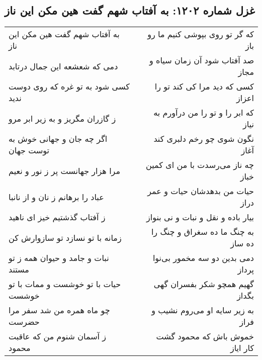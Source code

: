 \begin{center}
\section*{غزل شماره ۱۲۰۲: به آفتاب شهم گفت هین مکن این ناز}
\label{sec:1202}
\begin{longtable}{l p{0.5cm} r}
به آفتاب شهم گفت هین مکن این ناز
&&
که گر تو روی بپوشی کنیم ما رو باز
\\
دمی که شعشعه این جمال درتابد
&&
صد آفتاب شود آن زمان سیاه و مجاز
\\
کسی شود به تو غره که روی دوست ندید
&&
کسی که دید مرا کی کند تو را اعزاز
\\
ز گازران مگریز و به زیر ابر مرو
&&
که ابر را و تو را من درآورم به نیاز
\\
اگر چه جان و جهانی خوش به توست جهان
&&
نگون شوی چو رخم دلبری کند آغاز
\\
مرا هزار جهانست پر ز نور و نعیم
&&
چه ناز می‌رسدت با من ای کمین خباز
\\
عباد را برهانم ز نان و از نانبا
&&
حیات من بدهدشان حیات و عمر دراز
\\
ز آفتاب گذشتیم خیز ای ناهید
&&
بیار باده و نقل و نبات و نی بنواز
\\
زمانه با تو نسازد تو سازوارش کن
&&
به چنگ ما ده سغراق و چنگ را ده ساز
\\
نبات و جامد و حیوان همه ز تو مستند
&&
دمی بدین دو سه مخمور بی‌نوا پرداز
\\
حیات با تو خوشست و ممات با تو خوشست
&&
گهیم همچو شکر بفسران گهی بگداز
\\
چو ماه همره من شد سفر مرا حضرست
&&
به زیر سایه او می‌روم نشیب و فراز
\\
ز آسمان شنوم من که عاقبت محمود
&&
خموش باش که محمود گشت کار ایاز
\\
\end{longtable}
\end{center}
